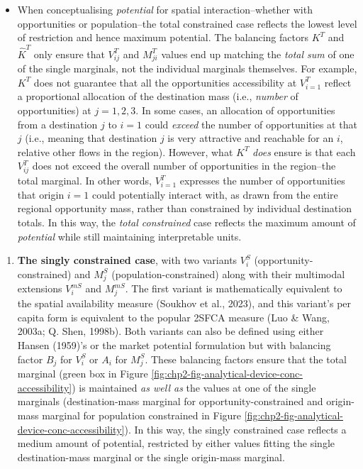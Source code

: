 \documentclass[
11pt, %
oneside, %
english, %
singlespacing, %
]{macthesis} %
\def\tightlist{}
\begin{document}
\begin{itemize}
\tightlist
\item
  When conceptualising \emph{potential} for spatial interaction--whether with opportunities or population--the total constrained case reflects the lowest level of restriction and hence maximum potential. The balancing factors \(K^T\) and \(\hat K^T\) only ensure that \(V_{ij}^T\) and \(M_{ji}^T\) values end up matching the \emph{total sum} of one of the single marginals, not the individual marginals themselves. For example, \(K^T\) does not guarantee that all the opportunities accessibility at \(V_{i=1}^T\) reflect a proportional allocation of the destination mass (i.e., \emph{number} of opportunities) at \(j=1, 2, 3\). In some cases, an allocation of opportunities from a destination \(j\) to \(i=1\) could \emph{exceed} the number of opportunities at that \(j\) (i.e., meaning that destination \(j\) is very attractive and reachable for an \(i\), relative other flows in the region). However, what \(K^T\) \emph{does} ensure is that each \(V_{ij}^T\) does not exceed the overall number of opportunities in the region--the total marginal. In other words, \(V_{i=1}^T\) expresses the number of opportunities that origin \(i=1\) could potentially interact with, as drawn from the entire regional opportunity mass, rather than constrained by individual destination totals. In this way, the \emph{total constrained} case reflects the maximum amount of \emph{potential} while still maintaining interpretable units.
\end{itemize}

\begin{enumerate}
\def\labelenumi{\arabic{enumi}.}
\setcounter{enumi}{2}
\tightlist
\item
  \textbf{The singly constrained case}, with two variants \(V_i^S\) (opportunity-constrained) and \(M_j^S\) (population-constrained) along with their multimodal extensions \(V_i^{mS}\) and \(M_j^{mS}\). The first variant is mathematically equivalent to the spatial availability measure (Soukhov et al., 2023), and this variant's per capita form is equivalent to the popular 2SFCA measure (Luo \& Wang, 2003a; Q. Shen, 1998b). Both variants can also be defined using either Hansen (1959)'s or the market potential formulation but with balancing factor \(B_j\) for \(V_i^S\) or \(A_i\) for \(M_j^S\). These balancing factors ensure that the total marginal (green box in Figure \ref{fig:chp2-fig-analytical-device-conc-accessibility}) is maintained \emph{as well as} the values at one of the single marginals (destination-mass marginal for opportunity-constrained and origin-mass marginal for population constrained in Figure \ref{fig:chp2-fig-analytical-device-conc-accessibility}). In this way, the singly constrained case reflects a medium amount of potential, restricted by either values fitting the single destination-mass marginal or the single origin-mass marginal.
\end{enumerate}
\end{document}
